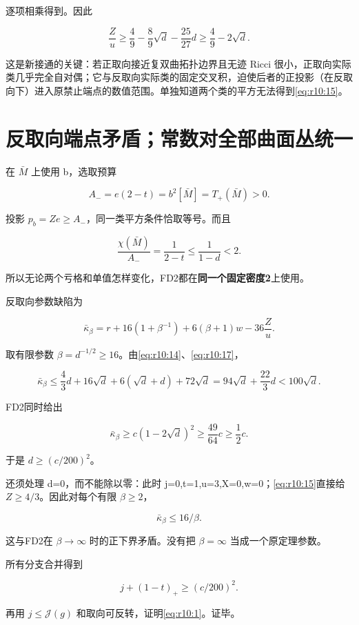 \documentclass[UTF8,11pt,openany,oneside,fontset=none]{ctexbook}
\begin{document}
逐项相乘得到。因此

\[
\frac Zu\ge\frac49-\frac89\sqrt d-\frac{25}{27}d
\ge\boxed{\frac49-2\sqrt d.}
\tag{10.17}\label{eq:r10:17}
\]

这是新接通的关键：若正取向接近复双曲拓扑边界且无迹 Ricci 很小，正取向实际类几乎完全自对偶；它与反取向实际类的固定交叉积，迫使后者的正投影（在反取向下）进入原禁止端点的数值范围。单独知道两个类的平方无法得到\eqref{eq:r10:15}。

\section{反取向端点矛盾；常数对全部曲面丛统一}\label{ch10:ux53cdux53d6ux5411ux7aefux70b9ux77dbux76feux5e38ux6570ux5bf9ux5168ux90e8ux66f2ux9762ux4e1bux7edfux4e00}

在 \(\bar M\) 上使用 b，选取预算

\[
A_-=e(2-t)=b^2[\bar M]=T_+(\bar M)>0.
\]

投影 \(p_b=Ze\ge A_-\)，同一类平方条件恰取等号。而且

\[
\frac{\chi(\bar M)}{A_-}=\frac1{2-t}
\le\frac1{1-d}<2.
\tag{10.18}\label{eq:r10:18}
\]

所以无论两个亏格和单值怎样变化，FD2都在\textbf{同一个固定密度2}上使用。

反取向参数缺陷为

\[
\bar\kappa_\beta
=r+16(1+\beta^{-1})+6(\beta+1)w-36\frac Zu.
\tag{10.19}\label{eq:r10:19}
\]

取有限参数 \(\beta=d^{-1/2}\ge16\)。由\eqref{eq:r10:14}、\eqref{eq:r10:17}，

\[
\bar\kappa_\beta
\le\frac43d+16\sqrt d+6(\sqrt d+d)+72\sqrt d
=94\sqrt d+\frac{22}{3}d
<100\sqrt d.
\tag{10.20}\label{eq:r10:20}
\]

FD2同时给出

\[
\bar\kappa_\beta\ge c(1-2\sqrt d)^2
\ge\frac{49}{64}c\ge\frac12c.
\tag{10.21}\label{eq:r10:21}
\]

于是 \(d\ge(c/200)^2\)。

还须处理 d=0，而不能除以零：此时 j=0,t=1,u=3,X=0,w=0；\eqref{eq:r10:15}直接给 \(Z\ge4/3\)。因此对每个有限 \(\beta\ge2\)，

\[
\bar\kappa_\beta\le16/\beta.
\]

这与FD2在 \(\beta\to\infty\) 时的正下界矛盾。没有把 \(\beta=\infty\) 当成一个原定理参数。

所有分支合并得到

\[
j+(1-t)_+\ge(c/200)^2.
\]

再用 \(j\le\mathcal J(g)\) 和取向可反转，证明\eqref{eq:r10:1}。证毕。
\end{document}
